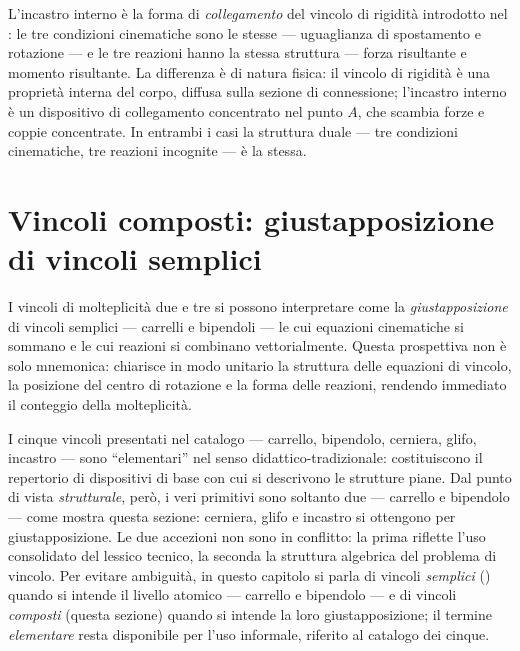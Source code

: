 \begin{oss}
	L'incastro interno è la forma di \emph{collegamento}
	del vincolo di rigidità introdotto nel
	: le tre condizioni
	cinematiche sono le stesse --- uguaglianza di
	spostamento e rotazione --- e le tre reazioni hanno
	la stessa struttura --- forza risultante e momento
	risultante. La differenza è di natura fisica: il
	vincolo di rigidità è una proprietà interna del
	corpo, diffusa sulla sezione di connessione;
	l'incastro interno è un dispositivo di collegamento
	concentrato nel punto $A$, che scambia forze e coppie
	concentrate. In entrambi i casi la struttura duale
	--- tre condizioni cinematiche, tre reazioni
	incognite --- è la stessa.
\end{oss}



\section{Vincoli composti: giustapposizione di vincoli semplici}
\label{sec:vincoli_composti}

I vincoli di molteplicità due e tre si possono interpretare 
come la \emph{giustapposizione} di vincoli semplici --- 
carrelli e bipendoli --- le cui equazioni cinematiche si 
sommano e le cui reazioni si combinano vettorialmente. 
Questa prospettiva non è solo mnemonica: chiarisce in modo 
unitario la struttura delle equazioni di vincolo, la 
posizione del centro di rotazione e la forma delle reazioni, 
rendendo immediato il conteggio della molteplicità.

\begin{oss}
	I cinque vincoli presentati nel catalogo --- carrello,
	bipendolo, cerniera, glifo, incastro --- sono ``elementari''
	nel senso didattico-tradizionale: costituiscono il
	repertorio di dispositivi di base con cui si descrivono
	le strutture piane. Dal punto di vista \emph{strutturale},
	però, i veri primitivi sono soltanto due --- carrello e
	bipendolo --- come mostra questa sezione: cerniera, glifo
	e incastro si ottengono per giustapposizione. Le due
	accezioni non sono in conflitto: la prima riflette l'uso
	consolidato del lessico tecnico, la seconda la struttura
	algebrica del problema di vincolo. Per evitare ambiguità,
	in questo capitolo si parla di vincoli \emph{semplici}
	() quando si intende il livello
	atomico --- carrello e bipendolo --- e di vincoli
	\emph{composti} (questa sezione) quando si intende la
	loro giustapposizione; il termine \emph{elementare} resta
	disponibile per l'uso informale, riferito al catalogo dei
	cinque.
\end{oss}


